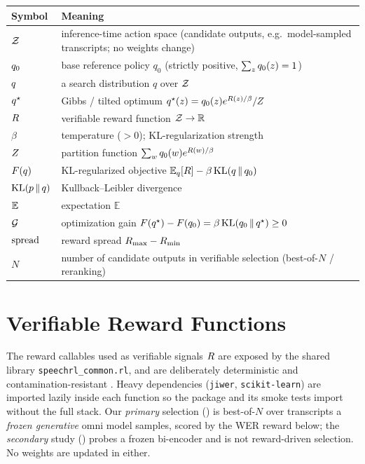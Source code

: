 \begin{center}
\begin{tabular}{ll}
\hline
Symbol & Meaning \\
\hline
$\mathcal{Z}$ & inference-time action space (candidate outputs, e.g.\ model-sampled transcripts; no weights change) \\
$q_{0}$ & base reference policy $q_0$ (strictly positive, $\sum_zq_{0}(z)=1$) \\
$q$ & a search distribution $q$ over $\mathcal{Z}$ \\
$q^{\star}$ & Gibbs / tilted optimum $q^{\star}(z)=q_{0}(z)e^{R(z)/\beta}/Z$ \\
$R$ & verifiable reward function $\mathcal{Z}\to\mathbb{R}$ \\
$\beta$ & temperature ($>0$); KL-regularization strength \\
$Z$ & partition function $\sum_w q_{0}(w)e^{R(w)/\beta}$ \\
$F\!\left(q\right)$ & KL-regularized objective $\mathbb{E}_q[R]-\beta\,\mathrm{KL}\!\left(q \,\|\, q_{0}\right)$ \\
$\mathrm{KL}\!\left(p \,\|\, q\right)$ & Kullback--Leibler divergence \\
$\mathbb{E}$ & expectation $\mathbb{E}$ \\
$\mathcal{G}$ & optimization gain $F\!\left(q^{\star}\right)-F\!\left(q_{0}\right)=\beta\,\mathrm{KL}\!\left(q_{0} \,\|\, q^{\star}\right)\ge 0$ \\
$\mathrm{spread}$ & reward spread $R_{\max}-R_{\min}$ \\
$N$ & number of candidate outputs in verifiable selection (best-of-$N$ / reranking) \\
\hline
\end{tabular}
\end{center}

\section{Verifiable Reward Functions}
\label{app:rewards}

The reward callables used as verifiable signals $R$ are exposed by the shared library
\texttt{speechrl\_common.rl}, and are deliberately deterministic and contamination-resistant
\citep{tulu3}. Heavy dependencies (\texttt{jiwer}, \texttt{scikit-learn}) are imported lazily inside
each function so the package and its smoke tests import without the full stack. Our \emph{primary}
selection () is best-of-$N$ over transcripts a \emph{frozen generative} omni model samples,
scored by the WER reward below; the \emph{secondary} study () probes a frozen bi-encoder and
is not reward-driven selection. No weights are updated in either.

